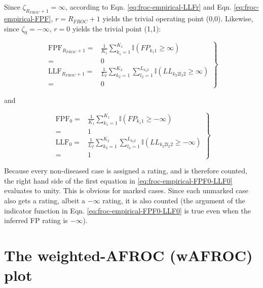 \documentclass[
]{book}
\begin{document}
Since \(\zeta_{R_{FROC}+1} = \infty\), according to Eqn. \eqref{eq:froc-empirical-LLFr} and Eqn. \eqref{eq:froc-empirical-FPF}, \(r = R_{FROC}+1\) yields the trivial operating point (0,0). Likewise, since \(\zeta_0 = -\infty\), \(r = 0\) yields the trivial point (1,1):

\begin{equation}
\left.
\begin{aligned} 
\text{FPF}_{R_{FROC}+1} =& \frac{1}{K_1} \sum_{k_1=1}^{K_1} \mathbb{I} \left ( FP_{k_1 1} \geq \infty \right )\\
=& 0\\
\text{LLF}_{R_{FROC}+1} =& \frac{1}{L_T} \sum_{k_2=1}^{K_2} \sum_{l_2=1}^{L_{k_2 2}}\mathbb{I} \left ( LL_{k_2 2 l_2 2} \geq \infty \right )\\
=& 0
\end{aligned}
\right \}
\label{eq:froc-empirical-FPF-LLF-last}
\end{equation}

and

\begin{equation}
\left.
\begin{aligned} 
\text{FPF}_0 =& \frac{1}{K_1} \sum_{k_1=1}^{K_1} \mathbb{I} \left ( FP_{k_1 1} \geq -\infty \right )\\
=& 1\\
\text{LLF}_0 =& \frac{1}{L_T} \sum_{k_2=1}^{K_2} \sum_{l_2=1}^{L_{k_2 2}}\mathbb{I} \left ( LL_{k_2 2 l_2 2} \geq -\infty \right )\\
=& 1
\end{aligned}
\right \}
\label{eq:froc-empirical-FPF0-LLF0}
\end{equation}

Because every non-diseased case is assigned a rating, and is therefore counted, the right hand side of the first equation in \eqref{eq:froc-empirical-FPF0-LLF0} evaluates to unity. This is obvious for marked cases. Since each unmarked case also gets a rating, albeit a \(-\infty\) rating, it is also counted (the argument of the indicator function in Eqn. \eqref{eq:froc-empirical-FPF0-LLF0} is true even when the inferred FP rating is \(-\infty\)).

\hypertarget{froc-empirical-wAFROC}{%
\section{The weighted-AFROC (wAFROC) plot}\label{froc-empirical-wAFROC}}
\end{document}
